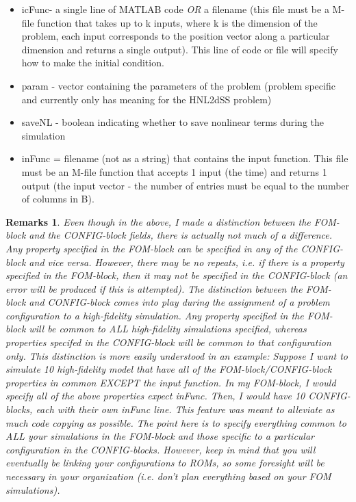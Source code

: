 \documentclass[notitlepage]{report}
\newtheorem*{Rem}{Remarks}
\begin{document}
\begin{itemize}
    \item icFunc- a single line of MATLAB code \emph{OR} a filename (this file must be a M-file function that takes up to k inputs, where k is the dimension of the problem, each input corresponds to the position vector along a particular dimension and returns a single output).  This line of code or file will specify how to make the initial condition.
    \item param - vector containing the parameters of the problem (problem specific and currently only has meaning for the HNL2dSS problem)
    \item saveNL - boolean indicating whether to save nonlinear terms during the simulation
    \item inFunc  = filename (not as a string) that contains the input function.  This file must be an M-file function that accepts 1 input (the time) and returns 1 output (the input vector - the number of entries must be equal to the number of columns in B).
\end{itemize}

\begin{Rem}
Even though in the above, I made a distinction between the FOM-block and the CONFIG-block fields, there is actually not much of a difference.  Any property specified in the FOM-block can be specified in any of the CONFIG-block and vice versa.  However, there may be no repeats, i.e. if there is a property specified in the FOM-block, then it may not be specified in the CONFIG-block (an error will be produced if this is attempted).  The distinction between the FOM-block and CONFIG-block comes into play during the assignment of a problem configuration to a high-fidelity simulation.  Any property specified in the FOM-block will be common to ALL high-fidelity simulations specified, whereas properties specifed in the CONFIG-block will be common to that configuration only.  This distinction is more easily understood in an example:  Suppose I want to simulate 10 high-fidelity model that have all of the FOM-block/CONFIG-block properties in common EXCEPT the input function.  In my FOM-block, I would specify all of the above properties expect inFunc.   Then, I would have 10 CONFIG-blocks, each with their own inFunc line.  This feature was meant to alleviate as much code copying as possible.  \emph{The point here is to specify everything common to ALL your simulations in the FOM-block and those specific to a particular configuration in the CONFIG-blocks}.  However, keep in mind that you will eventually be linking your configurations to ROMs, so some foresight will be necessary in your organization (i.e. don't plan everything based on your FOM simulations).
\end{Rem}
\end{document}
